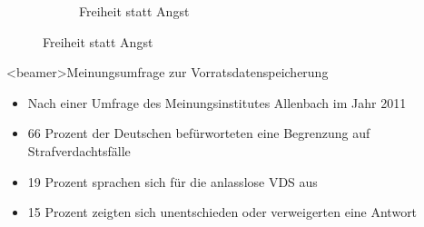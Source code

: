 \begin{frame}
\begin{figure}
\begin{subfigure}[b]{0.3\textwidth}
          \caption{Freiheit statt Angst}
          \label{fig:tiger}
        \end{subfigure}
      \end{figure}
    \end{frame}
    \begin{frame}<beamer>{Meinungsumfrage zur Vorratsdatenspeicherung}
       \begin{itemize}
        \item Nach einer Umfrage des Meinungsinstitutes Allenbach im Jahr 2011
        \item 66 Prozent der Deutschen befürworteten eine Begrenzung auf Strafverdachtsfälle
        \item 19 Prozent sprachen sich für die anlasslose VDS aus
        \item 15 Prozent zeigten sich unentschieden oder verweigerten eine Antwort
      \end{itemize}
    \end{frame}


